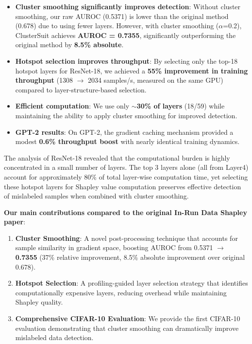 \documentclass[12pt,a4paper]{report}
\begin{document}
\begin{itemize}
    \item \textbf{Cluster smoothing significantly improves detection}: Without cluster smoothing, our raw AUROC (0.5371) is lower than the original method (0.678) due to using fewer layers. However, with cluster smoothing ($\alpha$=0.2), ClusterSuit achieves \textbf{AUROC = 0.7355}, significantly outperforming the original method by \textbf{8.5\% absolute}.
    
    \item \textbf{Hotspot selection improves throughput}: By selecting only the top-18 hotspot layers for ResNet-18, we achieved a \textbf{55\% improvement in training throughput} (1308 $\rightarrow$ 2034 samples/s, measured on the same GPU) compared to layer-structure-based selection.
    
    \item \textbf{Efficient computation}: We use only \textbf{$\sim$30\% of layers} (18/59) while maintaining the ability to apply cluster smoothing for improved detection.
    
    \item \textbf{GPT-2 results}: On GPT-2, the gradient caching mechanism provided a modest \textbf{0.6\% throughput boost} with nearly identical training dynamics.
\end{itemize}

\bigskip
The analysis of ResNet-18 revealed that the computational burden is highly concentrated in a small number of layers. The top 3 layers alone (all from Layer4) account for approximately 80\% of total layer-wise computation time, yet selecting these hotspot layers for Shapley value computation preserves effective detection of mislabeled samples when combined with cluster smoothing.

\bigskip
\textbf{Our main contributions compared to the original In-Run Data Shapley paper}:

\begin{enumerate}
    \item \textbf{Cluster Smoothing}: A novel post-processing technique that accounts for sample similarity in gradient space, boosting AUROC from 0.5371 $\rightarrow$ \textbf{0.7355} (37\% relative improvement, 8.5\% absolute improvement over original 0.678).
    
    \item \textbf{Hotspot Selection}: A profiling-guided layer selection strategy that identifies computationally expensive layers, reducing overhead while maintaining Shapley quality.
    
    \item \textbf{Comprehensive CIFAR-10 Evaluation}: We provide the first CIFAR-10 evaluation demonstrating that cluster smoothing can dramatically improve mislabeled data detection.
\end{enumerate}
\end{document}
